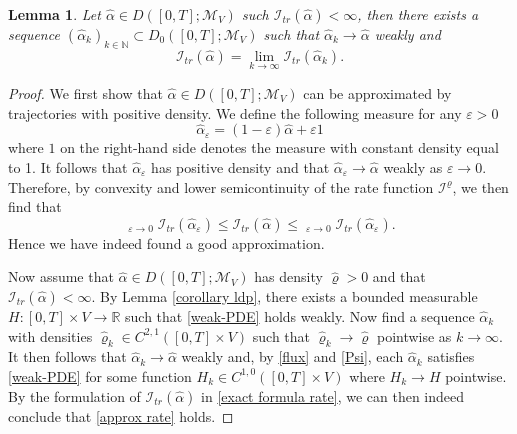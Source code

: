 \documentclass[11pt]{article}
\numberwithin{equation}{section}
\DeclareMathOperator*\uplim{\overline{lim}}
\DeclareMathOperator*\lowlim{\underline{lim}}
\theoremstyle{definition}
\theoremstyle{plain}
\newtheorem{Lemma}[Theorem]{Lemma}
\begin{document}
\begin{Lemma}\label{approx rate lemma}
    Let $\widehat{\alpha} \in D([0,T];\mathcal{M}_V)$ such $\mathcal{I}_{tr}(\widehat{\alpha})<\infty$, then there exists a sequence $(\widehat{\alpha}_k)_{k\in\mathbb{N}} \subset D_0([0,T];\mathcal{M}_V)$ such that $\widehat{\alpha}_k \to \widehat{\alpha}$ weakly and 
        \begin{equation}\label{approx rate}
            \mathcal{I}_{tr}(\widehat{\alpha}) = \lim_{k\to\infty} \mathcal{I}_{tr}(\widehat{\alpha}_k).
        \end{equation}
\end{Lemma}
\begin{proof}
    We first show that $\widehat{\alpha} \in D([0,T];\mathcal{M}_V)$ can be approximated  by trajectories with positive density. We define the following measure for any $\varepsilon>0$
        \begin{equation}
            \widehat{\alpha}_\varepsilon = (1-\varepsilon)\widehat{\alpha} + \varepsilon 1
        \end{equation}
    where $1$ on the right-hand side denotes the measure with constant density equal to 1. It follows that $\widehat{\alpha}_\varepsilon$ has positive density and that $\widehat{\alpha}_\varepsilon \to \widehat{\alpha}$ weakly as $\varepsilon\to 0$. Therefore, by convexity and lower semicontinuity of the rate function $\mathcal{I}^\varrho$, we then find that 
        \begin{equation}
            \uplim_{\varepsilon\to0} \mathcal{I}_{tr}(\widehat{\alpha}_\varepsilon) \leq \mathcal{I}_{tr}(\widehat{\alpha}) \leq \lowlim_{\varepsilon \to 0} \mathcal{I}_{tr}(\widehat{\alpha}_\varepsilon).
        \end{equation}
    Hence we have indeed found a good approximation.

    Now assume that $\widehat{\alpha} \in D([0,T];\mathcal{M}_V)$ has density $\widehat{\varrho}>0$ and that $\mathcal{I}_{tr}(\widehat{\alpha})<\infty$. By Lemma \ref{corollary ldp}, there exists a bounded measurable  $H:[0,T]\times V \to \mathbb{R}$ such that \eqref{weak-PDE} holds weakly. Now find a sequence $\widehat{\alpha}_k$ with densities $\widehat{\varrho}_k \in C^{2,1}([0,T]\times V)$ such that $\widehat{\varrho}_k\to \widehat{\varrho}$ pointwise as $k\to\infty$. It then follows that $\widehat{\alpha}_k \to \widehat{\alpha}$ weakly and, by \eqref{flux} and \eqref{Psi}, each $\widehat{\alpha}_k$ satisfies \eqref{weak-PDE} for some function  $H_k\in C^{1,0}([0,T]\times V)$ where $H_k\to H$ pointwise. By the formulation of $\mathcal{I}_{tr}(\widehat{\alpha})$ in \eqref{exact formula rate}, we can then indeed conclude that \eqref{approx rate} holds.
\end{proof}
\end{document}
